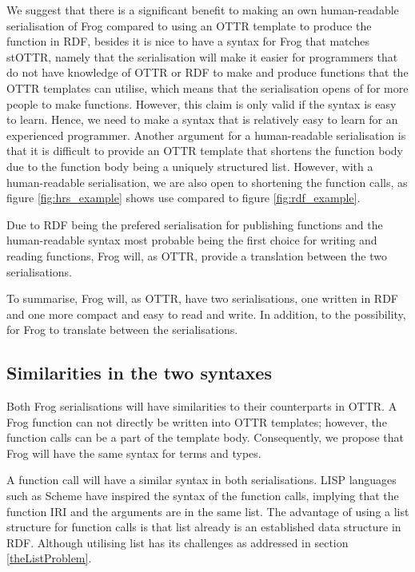 \para
We suggest that there is a significant benefit to making an own human-readable serialisation of Frog compared to using an OTTR template to produce the function in RDF, besides it is nice to have a syntax for Frog that matches stOTTR, namely that the serialisation will make it easier for programmers that do not have knowledge of OTTR or RDF to make and produce functions that the OTTR templates can utilise, which means that the serialisation opens of for more people to make functions. However, this claim is only valid if the syntax is easy to learn. Hence, we need to make a syntax that is relatively easy to learn for an experienced programmer. Another argument for a human-readable serialisation is that it is difficult to provide an OTTR template that shortens the function body due to the function body being a uniquely structured list. However, with a human-readable serialisation, we are also open to shortening the function calls, as figure \ref{fig:hrs_example} shows use compared to figure \ref{fig:rdf_example}. 

\para
Due to RDF being the prefered serialisation for publishing functions and the human-readable syntax most probable being the first choice for writing and reading functions, Frog will, as OTTR, provide a translation between the two serialisations. 

\para
To summarise, Frog will, as OTTR, have two serialisations, one written in RDF and one more compact and easy to read and write. In addition, to the possibility, for Frog to translate between the serialisations.

\subsection{Similarities in the two syntaxes}
Both Frog serialisations will have similarities to their counterparts in OTTR. A Frog function can not directly be written into OTTR templates; however, the function calls can be a part of the template body. Consequently, we propose that Frog will have the same syntax for terms and types. 

\para 
A function call will have a similar syntax in both serialisations. LISP languages such as Scheme have inspired the syntax of the function calls, implying that the function IRI and the arguments are in the same list. The advantage of using a list structure for function calls is that list already is an established data structure in RDF. Although utilising list has its challenges as addressed in section \ref{theListProblem}.

